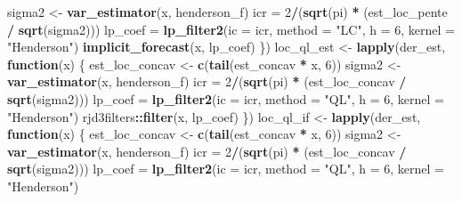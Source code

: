 \documentclass[
  12pt,
  a4paper,french]{article}
\newenvironment{Shaded}{\begin{snugshade}}{\end{snugshade}}
\newcommand{\AttributeTok}[1]{\textcolor[rgb]{0.13,0.29,0.53}{#1}}
\newcommand{\ControlFlowTok}[1]{\textcolor[rgb]{0.13,0.29,0.53}{\textbf{#1}}}
\newcommand{\DecValTok}[1]{\textcolor[rgb]{0.00,0.00,0.81}{#1}}
\newcommand{\FunctionTok}[1]{\textcolor[rgb]{0.13,0.29,0.53}{\textbf{#1}}}
\newcommand{\NormalTok}[1]{#1}
\newcommand{\OtherTok}[1]{\textcolor[rgb]{0.56,0.35,0.01}{#1}}
\newcommand{\SpecialCharTok}[1]{\textcolor[rgb]{0.81,0.36,0.00}{\textbf{#1}}}
\newcommand{\StringTok}[1]{\textcolor[rgb]{0.31,0.60,0.02}{#1}}
\newcommand\1{\mathds{1}}
\begin{document}
\begin{Shaded}
\begin{Highlighting}[]
\NormalTok{    sigma2 }\OtherTok{\textless{}{-}} \FunctionTok{var\_estimator}\NormalTok{(x, henderson\_f)}
\NormalTok{    icr }\OtherTok{=} \DecValTok{2}\SpecialCharTok{/}\NormalTok{(}\FunctionTok{sqrt}\NormalTok{(pi) }\SpecialCharTok{*}\NormalTok{ (est\_loc\_pente }\SpecialCharTok{/} \FunctionTok{sqrt}\NormalTok{(sigma2)))}
\NormalTok{    lp\_coef }\OtherTok{=} \FunctionTok{lp\_filter2}\NormalTok{(}\AttributeTok{ic =}\NormalTok{ icr, }
                         \AttributeTok{method =} \StringTok{"LC"}\NormalTok{, }\AttributeTok{h =} \DecValTok{6}\NormalTok{, }\AttributeTok{kernel =} \StringTok{"Henderson"}\NormalTok{)}
    \FunctionTok{implicit\_forecast}\NormalTok{(x, lp\_coef)}
\NormalTok{  \})}
\NormalTok{loc\_ql\_est }\OtherTok{\textless{}{-}} 
  \FunctionTok{lapply}\NormalTok{(der\_est, }\ControlFlowTok{function}\NormalTok{(x) \{}
\NormalTok{    est\_loc\_concav }\OtherTok{\textless{}{-}} \FunctionTok{c}\NormalTok{(}\FunctionTok{tail}\NormalTok{(est\_concav }\SpecialCharTok{*}\NormalTok{ x, }\DecValTok{6}\NormalTok{))}
\NormalTok{    sigma2 }\OtherTok{\textless{}{-}} \FunctionTok{var\_estimator}\NormalTok{(x, henderson\_f)}
\NormalTok{    icr }\OtherTok{=} \DecValTok{2}\SpecialCharTok{/}\NormalTok{(}\FunctionTok{sqrt}\NormalTok{(pi) }\SpecialCharTok{*}\NormalTok{ (est\_loc\_concav }\SpecialCharTok{/} \FunctionTok{sqrt}\NormalTok{(sigma2)))}
\NormalTok{    lp\_coef }\OtherTok{=} \FunctionTok{lp\_filter2}\NormalTok{(}\AttributeTok{ic =}\NormalTok{ icr, }
                         \AttributeTok{method =} \StringTok{"QL"}\NormalTok{, }\AttributeTok{h =} \DecValTok{6}\NormalTok{, }\AttributeTok{kernel =} \StringTok{"Henderson"}\NormalTok{)}
\NormalTok{    rjd3filters}\SpecialCharTok{::}\FunctionTok{filter}\NormalTok{(x, lp\_coef)}
\NormalTok{  \})}
\NormalTok{loc\_ql\_if }\OtherTok{\textless{}{-}} 
  \FunctionTok{lapply}\NormalTok{(der\_est, }\ControlFlowTok{function}\NormalTok{(x) \{}
\NormalTok{    est\_loc\_concav }\OtherTok{\textless{}{-}} \FunctionTok{c}\NormalTok{(}\FunctionTok{tail}\NormalTok{(est\_concav }\SpecialCharTok{*}\NormalTok{ x, }\DecValTok{6}\NormalTok{))}
\NormalTok{    sigma2 }\OtherTok{\textless{}{-}} \FunctionTok{var\_estimator}\NormalTok{(x, henderson\_f)}
\NormalTok{    icr }\OtherTok{=} \DecValTok{2}\SpecialCharTok{/}\NormalTok{(}\FunctionTok{sqrt}\NormalTok{(pi) }\SpecialCharTok{*}\NormalTok{ (est\_loc\_concav }\SpecialCharTok{/} \FunctionTok{sqrt}\NormalTok{(sigma2)))}
\NormalTok{    lp\_coef }\OtherTok{=} \FunctionTok{lp\_filter2}\NormalTok{(}\AttributeTok{ic =}\NormalTok{ icr, }
                         \AttributeTok{method =} \StringTok{"QL"}\NormalTok{, }\AttributeTok{h =} \DecValTok{6}\NormalTok{, }\AttributeTok{kernel =} \StringTok{"Henderson"}\NormalTok{)}

\end{Highlighting}
\end{Shaded}
\end{document}
